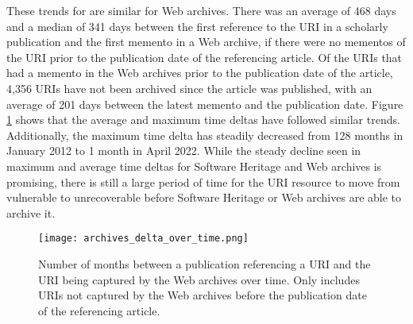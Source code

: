 These trends for are similar for Web archives. There was an average of 468 days and a median of 341 days between the first reference to the URI in a scholarly publication and the first memento in a Web archive, if there were no mementos of the URI prior to the publication date of the referencing article. Of the URIs that had a memento in the Web archives prior to the publication date of the article, 4,356 URIs have not been archived since the article was published, with an average of 201 days between the latest memento and the publication date. Figure \ref{fig:timemap_delta} shows that the average and maximum time deltas have followed similar trends. Additionally, the maximum time delta has steadily decreased from 128 months in January 2012 to 1 month in April 2022. While the steady decline seen in maximum and average time deltas for Software Heritage and Web archives is promising, there is still a large period of time for the URI resource to move from  vulnerable to unrecoverable before Software Heritage or Web archives are able to archive it.

\begin{figure}
    \centering
    \texttt{[image: archives\_delta\_over\_time.png]}
    \caption{Number of months between a publication referencing a URI and the URI being captured by the Web archives over time. Only includes URIs not captured by the Web archives before the publication date of the referencing article.}
    \label{fig:timemap_delta}
\end{figure}